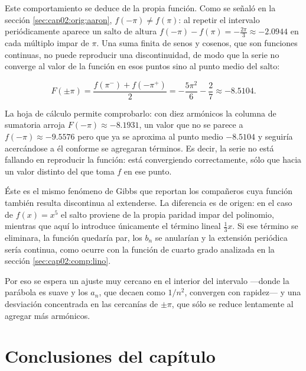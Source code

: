 Este comportamiento se deduce de la propia función. Como se señaló en la sección \ref{sec:cap02:orig:aaron}, $f(-\pi) \neq f(\pi)$: al repetir el intervalo periódicamente aparece un salto de altura $f(-\pi) - f(\pi) = -\frac{2\pi}{3} \approx -2.0944$ en cada múltiplo impar de $\pi$. Una suma finita de senos y cosenos, que son funciones continuas, no puede reproducir una discontinuidad, de modo que la serie no converge al valor de la función en esos puntos sino al punto medio del salto:

\begin{equation}
    F(\pm\pi) = \frac{f(\pi^{-}) + f(-\pi^{+})}{2}
              = -\frac{5\pi^{2}}{6} - \frac{2}{7} \approx -8.5104 .
    \label{eq:cap02:aaron:midpoint}
\end{equation}

La hoja de cálculo permite comprobarlo: con diez armónicos la columna de sumatoria arroja $F(-\pi) \approx -8.1931$, un valor que no se parece a $f(-\pi) \approx -9.5576$ pero que ya se aproxima al punto medio $-8.5104$ y seguiría acercándose a él conforme se agregaran términos. Es decir, la serie no está fallando en reproducir la función: está convergiendo correctamente, sólo que hacia un valor distinto del que toma $f$ en ese punto.

Éste es el mismo fenómeno de Gibbs que reportan los compañeros cuya función también resulta discontinua al extenderse. La diferencia es de origen: en el caso de $f(x) = x^5$ el salto proviene de la propia paridad impar del polinomio, mientras que aquí lo introduce únicamente el término lineal $\frac{1}{3}x$. Si ese término se eliminara, la función quedaría par, los $b_n$ se anularían y la extensión periódica sería continua, como ocurre con la función de cuarto grado analizada en la sección \ref{sec:cap02:comp:lino}.

Por eso se espera un ajuste muy cercano en el interior del intervalo —donde la parábola es suave y los $a_n$, que decaen como $1/n^{2}$, convergen con rapidez— y una desviación concentrada en las cercanías de $\pm\pi$, que sólo se reduce lentamente al agregar más armónicos.

\section{Conclusiones del capítulo}
\label{sec:cap02:conclusiones}

